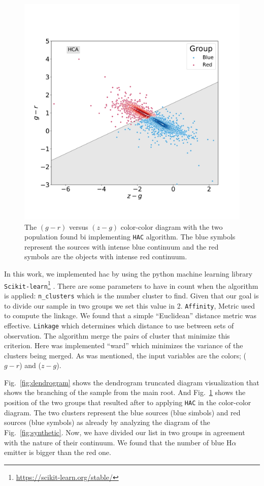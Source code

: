 \documentclass[fleqn,usenatbib]{mnras}
\begin{document}
\begin{figure}
	\includegraphics[width=0.9\linewidth]{Figs/blued-red-hierarchical.pdf}
    \caption{The $(g - r)$ versus $(z - g)$ color-color diagram with the two population
    found bi implementing \texttt{HAC} algorithm. The blue symbols represent the sources with 
    intense blue continuum and the red symbols are the objects with intense red continuum.}
    \label{fig:hierar}
\end{figure}

In this work, we implemented {\sc hac} by using the python machine learning library
\texttt{Scikit-learn}\footnote{\url{https://scikit-learn.org/stable/}} \citep{Pedregosa:2011}.
There are some parameters to have in count
when the algorithm is applied: \texttt{n\_clusters} which is the number cluster to find. Given
that our goal is to divide our sample in two groups we set this value in 2. \texttt{Affinity},
Metric used to compute the linkage. We found that a simple ``Euclidean'' distance metric was
effective. \texttt{Linkage} which determines which distance to use between sets of observation.
The algorithm merge the pairs of cluster that minimize this criterion. Here was implemented
``ward'' which minimizes the variance of the clusters being merged. As was mentioned,
the input variables are the colors; ($g - r$) and ($z - g$).

Fig.~\ref{fig:dendrogram} shows the dendrogram truncated diagram visualization that
shows the branching of the sample from the main root. And Fig.~\ref{fig:hierar} shows
the position of the two groups that resulted after to applying \texttt{HAC} in the
color-color diagram. The two clusters represent the blue sources (blue simbols)
and red sources (blue symbols) as already by analyzing the diagram of the
Fig.~\ref{fig:synthetic}. Now, we have divided our list in two groups in agreement
with the nature of their continuum. We found that the number of blue H{$\alpha$}
emitter is bigger than the red one.
\end{document}
